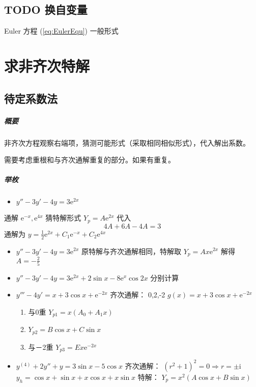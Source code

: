 \documentclass[11pt]{report}
\begin{document}
\section{{\bfseries\sffamily TODO} 换自变量}
\label{sec:org8e2f4d4}
Euler 方程
(\ref{eq:EulerEqu})
一般形式

\chapter{求非齐次特解}
\label{sec:org19965e6}

\section{待定系数法}
\label{sec:orgba6f55e}
\paragraph{概要}
非齐次方程观察右端项，猜测可能形式（采取相同相似形式），代入解出系数。

需要考虑重根和与齐次通解重复的部分。如果有重复。

\paragraph{举枚}
\begin{itemize}
\item \(y''-3y'-4y=3\mathrm{e}^{2x}\)
\end{itemize}
通解 \(\mathrm{e}^{-x},\mathrm{e}^{4x}\)
猜特解形式 \(Y_p=A\mathrm{e}^{2x}\)
代入
\begin{equation}
\label{eq:6}
4A+6A-4A=3
\end{equation}
通解为 \(y=\frac{1}{2}\mathrm{e}^{2x}+C_1\mathrm{e}^{-x}+C_2\mathrm{e}^{4x}\)

\begin{itemize}
\item \(y''-3y'-4y=3\mathrm{e}^{2x}\)
原特解与齐次通解相同，特解取 \(Y_p=Ax\mathrm{e}^{2x}\) 解得 \(A=-\frac{2}{5}\)

\item \(y''-3y'-4y=3\mathrm{e}^{2x}+2\sin x-8\mathrm{e}^x\cos 2x\)
分别计算

\item \(y'''-4y'=x+3\cos x+\mathrm{e}^{-2x}\)
齐次通解： 0,2,-2
\(g(x)=x+3\cos x+\mathrm{e}^{-2x}\)
\begin{enumerate}
\item 与0重  \(Y_{p1}=x(A_0+A_1x)\)
\item \(Y_{p2}=B\cos x+C\sin x\)
\item 与－2重 \(Y_{p3}=Ex\mathrm{e}^{-2x}\)
\end{enumerate}

\item \(y^{(4)}+2y''+y=3\sin x-5\cos x\)
齐次通解： \((r^2+1)^2=0\Rightarrow r=\pm \mathrm{i}\)
\(y_h=\cos x+\sin x+x\cos x+x\sin x\)
特解： \(Y_p=x^2(A\cos x+B\sin x)\)
\end{itemize}
\end{document}
